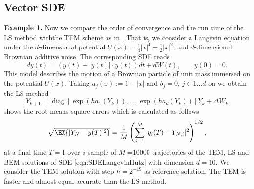 \documentclass[sort&compress, preprint]{elsarticle}
\theoremstyle{definition}
\theoremstyle{plain}%
\theoremstyle{remark}
\DeclareMathOperator{\diag}{diag}
\newcommand{\SM}{LS\xspace}
\begin{document}
\subsection{Vector SDE}
{\textbf{Example 1.}}
Now we compare the order of convergence
and the run time of the \SM method withthe TEM scheme as in \cite{Hutzenthaler2012a}. That is,
we consider a  Langevin equation under  the $d$-dimensional potential 
$U(x)= \frac{1}{4}|x|^4 - \frac{1}{2}|x|^2$, and $d$-dimensional Brownian additive noise. The corresponding
SDE reads
\begin{equation}\label{eqn:SDELangevinHutz}
dy(t) = 
\left(
y(t) - |y(t)| \cdot y(t)
\right)dt
+dW(t), \qquad y(0)=0.
\end{equation}
This model describes the motion of a Brownian particle of unit mass immersed on the potential $U(x)$. 
Taking $a_j(x):=1-|x|$ and $b_j=0$, $j\in 1\dots d$ on we obtain the \SM method
\begin{equation}\label{eqn:LangevinLSMethod}
	Y_{k+1} = \diag
	\left[		
		\exp(h a_1(Y_k)), \dots, \exp(ha_d(Y_k)) 
	\right] 
	Y_k+
		\Delta W_k
\end{equation}
 shows the root means square errors which is calculated as follows
\begin{equation}
	\sqrt{\EX{|Y_N - y(T)|^2}} = 
	\frac{1}{M}
	\left(
	\sum_{i=1}^M
		|y_i(T) - Y_{N,i}|^2	
	\right)^{1/2},
\end{equation}
at a final time $T=1$ over a sample of 
$M$ =\num{10000} trajectories of the TEM, \SM  and BEM solutions of SDE \eqref{eqn:SDELangevinHutz} 
with dimension $d=10$.  We consider the TEM solution with step $h=2^{-19}$ as reference solution. 
The TEM is faster and almost equal accurate than the LS method.
\end{document}
